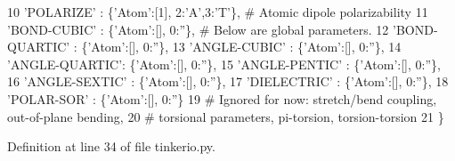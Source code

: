 \begin{DoxyCode}
10          \textcolor{stringliteral}{'POLARIZE'}     : \{\textcolor{stringliteral}{'Atom'}:[1], 2:\textcolor{stringliteral}{'A'},3:\textcolor{stringliteral}{'T'}\},       \textcolor{comment}{# Atomic dipole polarizability}
11          \textcolor{stringliteral}{'BOND-CUBIC'}   : \{\textcolor{stringliteral}{'Atom'}:[], 0:\textcolor{stringliteral}{''}\},    \textcolor{comment}{# Below are global parameters.}
12          \textcolor{stringliteral}{'BOND-QUARTIC'} : \{\textcolor{stringliteral}{'Atom'}:[], 0:\textcolor{stringliteral}{''}\},
13          \textcolor{stringliteral}{'ANGLE-CUBIC'}  : \{\textcolor{stringliteral}{'Atom'}:[], 0:\textcolor{stringliteral}{''}\},
14          \textcolor{stringliteral}{'ANGLE-QUARTIC'}: \{\textcolor{stringliteral}{'Atom'}:[], 0:\textcolor{stringliteral}{''}\},
15          \textcolor{stringliteral}{'ANGLE-PENTIC'} : \{\textcolor{stringliteral}{'Atom'}:[], 0:\textcolor{stringliteral}{''}\},
16          \textcolor{stringliteral}{'ANGLE-SEXTIC'} : \{\textcolor{stringliteral}{'Atom'}:[], 0:\textcolor{stringliteral}{''}\},
17          \textcolor{stringliteral}{'DIELECTRIC'}   : \{\textcolor{stringliteral}{'Atom'}:[], 0:\textcolor{stringliteral}{''}\},
18          \textcolor{stringliteral}{'POLAR-SOR'}    : \{\textcolor{stringliteral}{'Atom'}:[], 0:\textcolor{stringliteral}{''}\}
19                                                 \textcolor{comment}{# Ignored for now: stretch/bend coupling, out-of-plane
       bending,}
20                                                 \textcolor{comment}{# torsional parameters, pi-torsion, torsion-torsion}
21          \}
\end{DoxyCode}


Definition at line 34 of file tinkerio.\-py.


